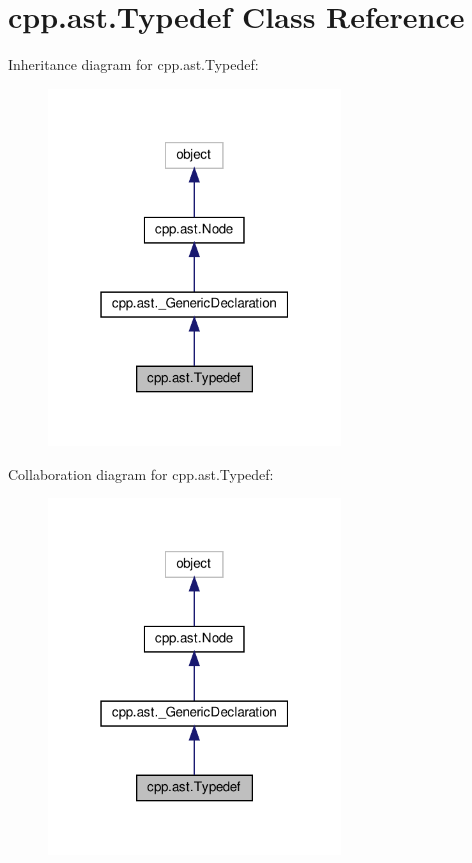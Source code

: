 \hypertarget{classcpp_1_1ast_1_1_typedef}{}\section{cpp.\+ast.\+Typedef Class Reference}
\label{classcpp_1_1ast_1_1_typedef}


Inheritance diagram for cpp.\+ast.\+Typedef\+:
\nopagebreak
\begin{figure}[H]
\begin{center}
\leavevmode
\includegraphics[width=220pt]{classcpp_1_1ast_1_1_typedef__inherit__graph}
\end{center}
\end{figure}


Collaboration diagram for cpp.\+ast.\+Typedef\+:
\nopagebreak
\begin{figure}[H]
\begin{center}
\leavevmode
\includegraphics[width=220pt]{classcpp_1_1ast_1_1_typedef__coll__graph}
\end{center}
\end{figure}
